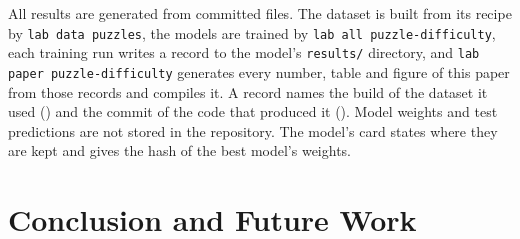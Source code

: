 \documentclass[11pt]{article}
\begin{document}
All results are generated from committed files. The dataset is built from
its recipe by \texttt{lab data puzzles}, the models are trained by
\texttt{lab all puzzle-difficulty}, each training run writes a record to the
model's \texttt{results/} directory, and
\texttt{lab paper puzzle-difficulty} generates every number, table and
figure of this paper from those records and compiles it. A record names the
build of the dataset it used () and the commit of the
code that produced it (). Model weights and test predictions
are not stored in the repository. The model's card states where they are
kept and gives the hash of the best model's weights.

\section{Conclusion and Future Work}
\label{sec:conclusion}
\end{document}
